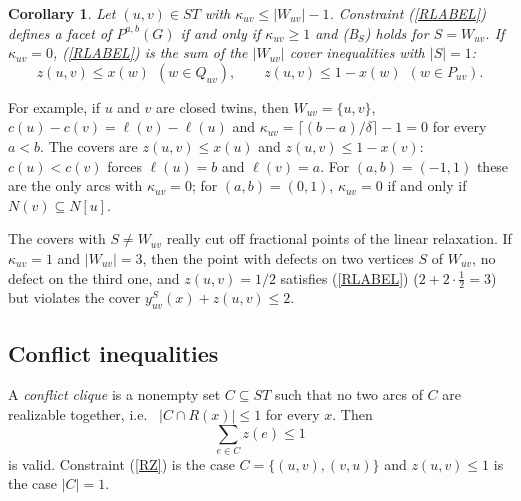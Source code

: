 \documentclass[a4paper,11pt]{article}
\newcommand{\ie}{{i.e.~}}
\newtheorem{cor}{Corollary}
\theoremstyle{definition}
\begin{document}
\begin{cor} \label{CRLABEL}
Let $(u,v) \in ST$ with $\kappa_{uv} \leq |W_{uv}| - 1$. Constraint (\ref{RLABEL}) defines a facet of $P^{a,b}(G)$ if and only if
$\kappa_{uv} \geq 1$ and (B$_S$) holds for $S = W_{uv}$. If $\kappa_{uv} = 0$, (\ref{RLABEL}) is the sum of the $|W_{uv}|$ cover inequalities with
$|S| = 1$:
$$z(u,v) \leq x(w)~~(w \in Q_{uv}), \qquad z(u,v) \leq 1 - x(w)~~(w \in P_{uv}).$$
\end{cor}

For example, if $u$ and $v$ are closed twins, then $W_{uv} = \{u,v\}$, $c(u) - c(v) = \ell(v) - \ell(u)$ and $\kappa_{uv} = \lceil (b-a)/\delta \rceil - 1 = 0$
for every $a < b$. The covers are $z(u,v) \leq x(u)$ and $z(u,v) \leq 1 - x(v)$: $c(u) < c(v)$ forces $\ell(u) = b$ and $\ell(v) = a$. For
$(a,b) = (-1,1)$ these are the only arcs with $\kappa_{uv} = 0$; for $(a,b) = (0,1)$, $\kappa_{uv} = 0$ if and only if $N(v) \subseteq N[u]$.

The covers with $S \neq W_{uv}$ really cut off fractional points of the linear relaxation. If $\kappa_{uv} = 1$ and $|W_{uv}| = 3$, then the point with
defects on two vertices $S$ of $W_{uv}$, no defect on the third one, and $z(u,v) = 1/2$ satisfies (\ref{RLABEL}) ($2 + 2 \cdot \frac12 = 3$) but
violates the cover $y^S_{uv}(x) + z(u,v) \leq 2$.

\subsection{Conflict inequalities}

A \emph{conflict clique} is a nonempty set $C \subseteq ST$ such that no two arcs of $C$ are realizable together, \ie
$|C \cap R(x)| \leq 1$ for every $x$. Then
\begin{equation} \label{RCLQ}
\sum_{e \in C} z(e) \leq 1
\end{equation}
is valid. Constraint (\ref{RZ}) is the case $C = \{(u,v),(v,u)\}$ and $z(u,v) \leq 1$ is the case $|C| = 1$.
\end{document}
